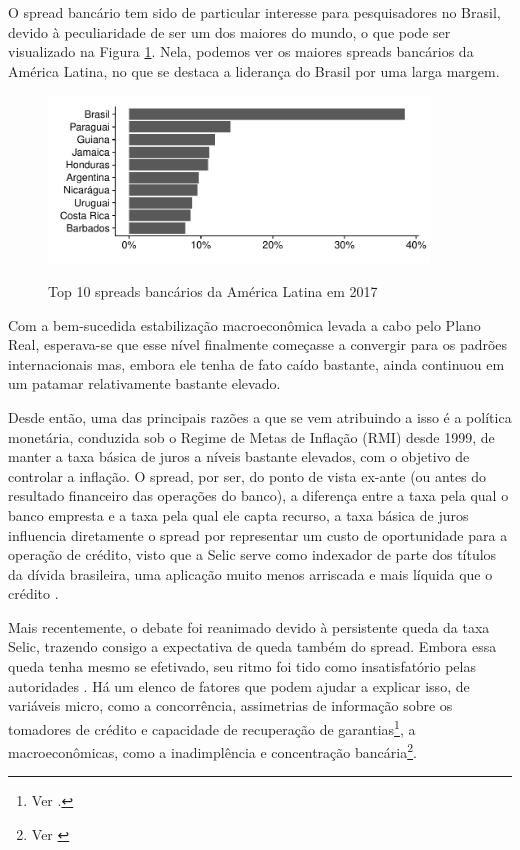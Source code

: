 \documentclass[a4paper,
               article,
               12pt,
               openany,
               oneside,
               english,
               brazil]{abntex2}
\numberwithin{equation}{section}
\begin{document}
    O spread bancário tem sido de particular interesse para pesquisadores no Brasil, devido à peculiaridade de ser um dos maiores do mundo, o que pode ser visualizado na Figura \ref{spreadal}. Nela, podemos ver os maiores spreads bancários da América Latina, no que se destaca a liderança do Brasil por uma larga margem.

    \begin{figure}[h]
        \centering
        \caption{Top 10 spreads bancários da América Latina em 2017}
        \includegraphics[width = 0.9\textwidth, scale=1]{spread_AL.pdf}
        \label{spreadal}
    \end{figure}

    Com a bem-sucedida estabilização macroeconômica levada a cabo pelo Plano Real, esperava-se que esse nível finalmente começasse a convergir para os padrões internacionais mas, embora ele tenha de fato caído bastante, ainda continuou em um patamar relativamente bastante elevado.

    Desde então, uma das principais razões a que se vem atribuindo a isso é a política monetária, conduzida sob o Regime de Metas de Inflação (RMI) desde 1999, de manter a taxa básica de juros a níveis bastante elevados, com o objetivo de controlar a inflação. O spread, por ser, do ponto de vista ex-ante (ou antes do resultado financeiro das operações do banco), a diferença entre a taxa pela qual o banco empresta e a taxa pela qual ele capta recurso, a taxa básica de juros influencia diretamente o spread por representar um custo de oportunidade para a operação de crédito, visto que a Selic serve como indexador de parte dos títulos da dívida brasileira, uma aplicação muito menos arriscada e mais líquida que o crédito \cite[p.~7]{manhica12}.

    Mais recentemente, o debate foi reanimado devido à persistente queda da taxa Selic, trazendo consigo a expectativa de queda também do spread. Embora essa queda tenha mesmo se efetivado, seu ritmo foi tido como insatisfatório pelas autoridades \cite{valor1}. Há um elenco de fatores que podem ajudar a explicar isso, de variáveis micro, como a concorrência, assimetrias de informação sobre os tomadores de crédito e capacidade de recuperação de garantias\footnote{Ver \cite[p.~13]{reb2018}.}, a macroeconômicas, como a inadimplência e concentração bancária\footnote{Ver \cite{valor2}}.
    
\end{document}
